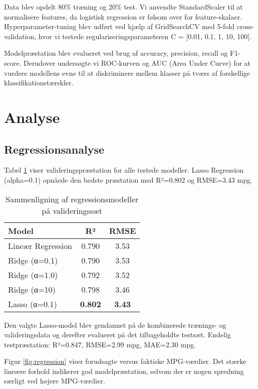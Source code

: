 \documentclass[a4paper, twocolumn]{article}
\begin{document}
Data blev opdelt 80\% træning og 20\% test. Vi anvendte StandardScaler til at normalisere features, da logistisk regression er følsom over for feature-skalaer. Hyperparameter-tuning blev udført ved hjælp af GridSearchCV med 5-fold cross-validation, hvor vi testede regulariseringsparameteren C = [0.01, 0.1, 1, 10, 100].

Modelpræstation blev evalueret ved brug af accuracy, precision, recall og F1-score. Derudover undersøgte vi ROC-kurven og AUC (Area Under Curve) for at vurdere modellens evne til at diskriminere mellem klasser på tværs af forskellige klassifikationstærskler.

\section{Analyse}
\label{sec:analysis}

\subsection{Regressionsanalyse}
Tabel \ref{tab:regression} viser valideringspræstation for alle testede modeller. Lasso Regression (alpha=0.1) opnåede den bedste præstation med R²=0.802 og RMSE=3.43 mpg.

\begin{table}[h]
\centering
\caption{Sammenligning af regressionsmodeller på valideringssæt}
\label{tab:regression}
\begin{tabular}{lcc}
\toprule
Model & R² & RMSE \\
\midrule
Lineær Regression & 0.790 & 3.53 \\
Ridge (α=0.1) & 0.790 & 3.53 \\
Ridge (α=1.0) & 0.792 & 3.52 \\
Ridge (α=10) & 0.798 & 3.46 \\
Lasso (α=0.1) & \textbf{0.802} & \textbf{3.43} \\
\bottomrule
\end{tabular}
\end{table}

Den valgte Lasso-model blev gendannet på de kombinerede trænings- og valideringsdata og derefter evalueret på det tilbageholdte testsæt. Endelig testpræstation: R²=0.847, RMSE=2.99 mpg, MAE=2.30 mpg.

Figur \ref{fig:regression} viser forudsagte versus faktiske MPG-værdier. Det stærke lineære forhold indikerer god modelpræstation, selvom der er nogen spredning særligt ved højere MPG-værdier.
\end{document}
